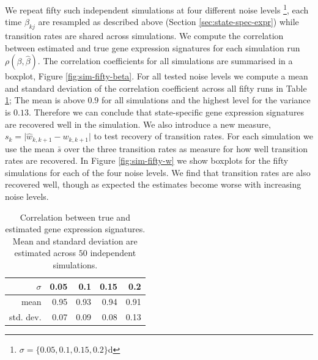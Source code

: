 We repeat fifty such independent simulations at four different noise levels \footnote{$\sigma=\lbrace 0.05, 0.1, 0.15, 0.2 \rbrace$d}, each time $\beta_{kj}$ are resampled as described above (Section \ref{sec:state-spec-expr}) while transition rates are shared across simulations. We compute the correlation between estimated and true gene expression signatures for each simulation run $\rho(\beta,\hat{\beta})$. The correlation coefficients for all simulations are summarised in a boxplot, Figure \ref{fig:sim-fifty-beta}. For all tested noise levels we compute a mean and standard deviation of the correlation coefficient across all fifty runs in Table \ref{tab:cor-beta-fifty}; The mean is above $0.9$ for all simulations and the highest level for the variance is $0.13$. Therefore we can conclude that state-specific gene expression signatures are recovered well in the simulation. We also introduce a new measure, $s_k = \lvert \hat{w}_{k,k+1} - w_{k,k+1} \rvert$ to test recovery of transition rates. For each simulation we use the mean $\bar{s}$ over the three transition rates as measure for how well transition rates are recovered. In Figure \ref{fig:sim-fifty-w} we show boxplots for the fifty simulations for each of the four noise levels. We find that transition rates are also recovered well, though as expected the estimates become worse with increasing noise levels.

\begin{table}[ht]
\centering
\begin{tabular}{rrrrr}
  \hline
$\sigma$ & 0.05 & 0.1 & 0.15 & 0.2 \\ 
  \hline
mean & 0.95 & 0.93 & 0.94 & 0.91 \\ 
std. dev. & 0.07 & 0.09 & 0.08 & 0.13 \\ 
   \hline
 \end{tabular}
 \caption{Correlation between true and estimated gene expression signatures. Mean and standard deviation are estimated across $50$ independent simulations.}
 \label{tab:cor-beta-fifty}
\end{table}

